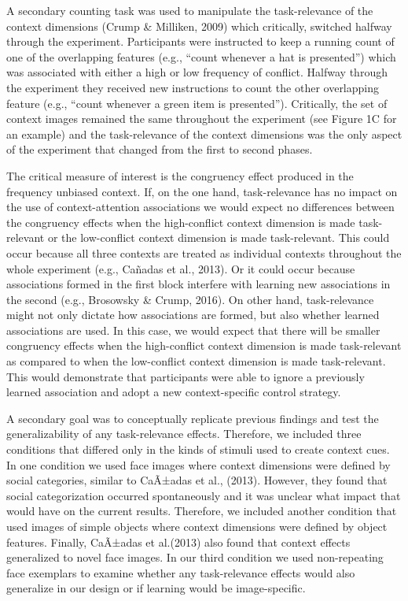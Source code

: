 \documentclass[english,,man,floatsintext]{apa6}
\begin{document}
A secondary counting task was used to manipulate the task-relevance of the context dimensions (Crump \& Milliken, 2009) which critically, switched halfway through the experiment. Participants were instructed to keep a running count of one of the overlapping features (e.g., \enquote{count whenever a hat is presented}) which was associated with either a high or low frequency of conflict. Halfway through the experiment they received new instructions to count the other overlapping feature (e.g., \enquote{count whenever a green item is presented}). Critically, the set of context images remained the same throughout the experiment (see Figure 1C for an example) and the task-relevance of the context dimensions was the only aspect of the experiment that changed from the first to second phases.

The critical measure of interest is the congruency effect produced in the frequency unbiased context. If, on the one hand, task-relevance has no impact on the use of context-attention associations we would expect no differences between the congruency effects when the high-conflict context dimension is made task-relevant or the low-conflict context dimension is made task-relevant. This could occur because all three contexts are treated as individual contexts throughout the whole experiment (e.g., Cañadas et al., 2013). Or it could occur because associations formed in the first block interfere with learning new associations in the second (e.g., Brosowsky \& Crump, 2016). On other hand, task-relevance might not only dictate how associations are formed, but also whether learned associations are used. In this case, we would expect that there will be smaller congruency effects when the high-conflict context dimension is made task-relevant as compared to when the low-conflict context dimension is made task-relevant. This would demonstrate that participants were able to ignore a previously learned association and adopt a new context-specific control strategy.

A secondary goal was to conceptually replicate previous findings and test the generalizability of any task-relevance effects. Therefore, we included three conditions that differed only in the kinds of stimuli used to create context cues. In one condition we used face images where context dimensions were defined by social categories, similar to CaÃ±adas et al., (2013). However, they found that social categorization occurred spontaneously and it was unclear what impact that would have on the current results. Therefore, we included another condition that used images of simple objects where context dimensions were defined by object features. Finally, CaÃ±adas et al.(2013) also found that context effects generalized to novel face images. In our third condition we used non-repeating face exemplars to examine whether any task-relevance effects would also generalize in our design or if learning would be image-specific.
\end{document}
